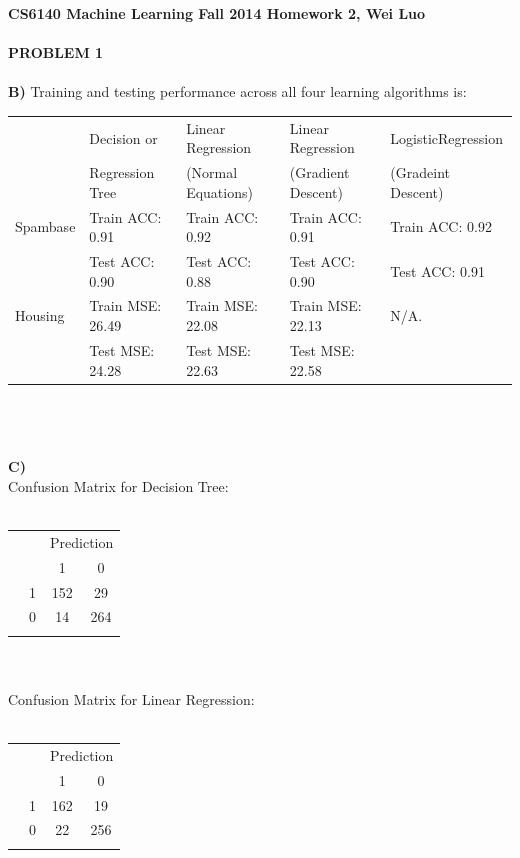 \documentclass[11pt,a4paper,fleqn]{article}
\begin{document}
\textbf{CS6140 Machine Learning Fall 2014 Homework 2, Wei Luo }\\
\\
\textbf{PROBLEM 1}\\
\\
 \textbf{B)} Training and testing performance across all four learning algorithms is: \\
 
 \hskip-2cm
 \begin{tabular}{|l|l|l|l|l|}
\hline
 &Decision or &Linear Regression &Linear Regression&LogisticRegression\\
 &Regression Tree&(Normal Equations)&(Gradient Descent)&(Gradeint Descent)\\
\hline
Spambase&Train ACC: 0.91&Train ACC: 0.92&Train ACC: 0.91&Train ACC: 0.92\\
&Test ACC: 0.90&Test ACC: 0.88&Test ACC: 0.90&Test ACC: 0.91\\
\hline
Housing&Train MSE: 26.49&Train MSE: 22.08&Train MSE: 22.13&N/A.\\
 &Test MSE: 24.28&Test MSE: 22.63&Test MSE: 22.58&\\
\hline
\end{tabular}\\
\\ \\
 \textbf{C)} \\
 Confusion Matrix for Decision Tree:\\ \\
\begin{tabular}{cc|c|c|}
\multicolumn{2}{c}{}&\multicolumn{2}{c}{Prediction}\\
\multicolumn{2}{c}{}&\multicolumn{1}{c}{1}&\multicolumn{1}{c}{0}\\
\hhline{~~--}
\multirow{2}{*}{Label}
&1&152&29\\
\hhline{~~--}
&0&14&264\\
\hhline{~~--}
\end{tabular}\\ \\
 Confusion Matrix for Linear Regression:\\ \\
\begin{tabular}{cc|c|c|}
\multicolumn{2}{c}{}&\multicolumn{2}{c}{Prediction}\\
\multicolumn{2}{c}{}&\multicolumn{1}{c}{1}&\multicolumn{1}{c}{0}\\
\hhline{~~--}
\multirow{2}{*}{Label}
&1&162&19\\
\hhline{~~--}
&0&22&256\\
\hhline{~~--}
\end{tabular}\\ \\
\end{document}
